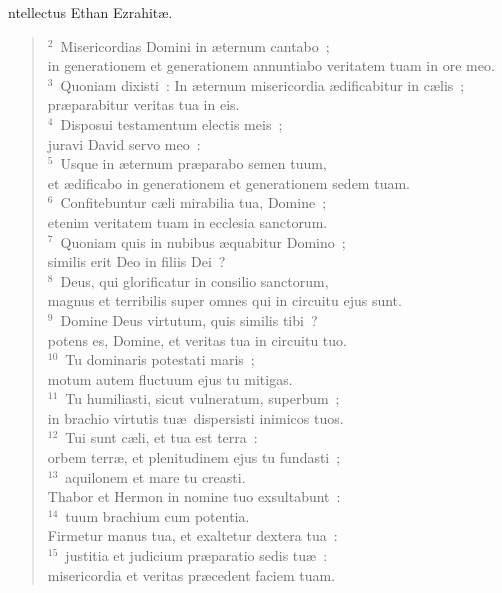 \bchapter[Psalm]
ntellectus Ethan Ezrahit\ae .
\begin{verse}${}^{2}$~Misericordias Domini in \ae ternum cantabo~;\\ in generationem et generationem annuntiabo veritatem tuam in ore meo.\\
${}^{3}$~Quoniam dixisti~: In \ae ternum misericordia \ae dificabitur in c\ae lis~;\\ pr\ae parabitur veritas tua in eis.\\
${}^{4}$~Disposui testamentum electis meis~;\\ juravi David servo meo~:\\
${}^{5}$~Usque in \ae ternum pr\ae parabo semen tuum,\\ et \ae dificabo in generationem et generationem sedem tuam.\\
${}^{6}$~Confitebuntur c\ae li mirabilia tua, Domine~;\\ etenim veritatem tuam in ecclesia sanctorum.\\
${}^{7}$~Quoniam quis in nubibus \ae quabitur Domino~;\\ similis erit Deo in filiis Dei~?\\
${}^{8}$~Deus, qui glorificatur in consilio sanctorum,\\ magnus et terribilis super omnes qui in circuitu ejus sunt.\\
${}^{9}$~Domine Deus virtutum, quis similis tibi~?\\ potens es, Domine, et veritas tua in circuitu tuo.\\
${}^{10}$~Tu dominaris potestati maris~;\\ motum autem fluctuum ejus tu mitigas.\\
${}^{11}$~Tu humiliasti, sicut vulneratum, superbum~;\\ in brachio virtutis tu\ae\ dispersisti inimicos tuos.\\
${}^{12}$~Tui sunt c\ae li, et tua est terra~:\\ orbem terr\ae , et plenitudinem ejus tu fundasti~;\\
${}^{13}$~aquilonem et mare tu creasti.\\ Thabor et Hermon in nomine tuo exsultabunt~:\\
${}^{14}$~tuum brachium cum potentia.\\ Firmetur manus tua, et exaltetur dextera tua~:\\
${}^{15}$~justitia et judicium pr\ae paratio sedis tu\ae~:\\ misericordia et veritas pr\ae cedent faciem tuam.\\

\end{verse}
